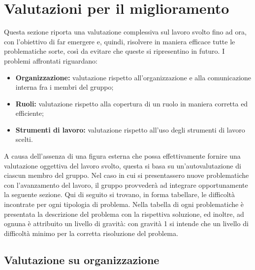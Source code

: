 \chapter{Valutazioni per il miglioramento} \label{ValutazionePerIlMiglioramento}
Questa sezione riporta una valutazione complessiva sul lavoro svolto fino ad ora, con l’obiettivo di far emergere e, quindi, risolvere in maniera efficace tutte le problematiche sorte, così da evitare che queste si ripresentino in futuro. 
I problemi affrontati riguardano: 
\begin{itemize}
\item \textbf{Organizzazione:} valutazione rispetto all'organizzazione e alla comunicazione interna fra i membri del gruppo;
\item \textbf{Ruoli:} valutazione rispetto alla copertura di un ruolo in maniera corretta ed efficiente;
\item \textbf{Strumenti di lavoro:} valutazione rispetto all’uso degli strumenti di lavoro scelti.
\end{itemize}
A causa dell’assenza di una figura esterna che possa effettivamente fornire una valutazione oggettiva del lavoro svolto, questa si basa su un'autovalutazione di ciascun membro del gruppo. 
Nel caso in cui si presentassero nuove problematiche con l’avanzamento del lavoro, il gruppo provvederà ad integrare opportunamente la seguente sezione.
Qui di seguito si trovano, in forma tabellare, le difficoltà incontrate per ogni tipologia di problema. Nella tabella di ogni problematiche è presentata la descrizione del problema con la rispettiva soluzione, ed inoltre, ad ognuna è attribuito un livello di gravità: con gravità 1 si intende che un livello di difficoltà minimo per la corretta risoluzione del problema. 

\section{Valutazione su organizzazione}  \label{ValutazionePerIlMiglioramentoValutazioneSuOrganizzazione}

